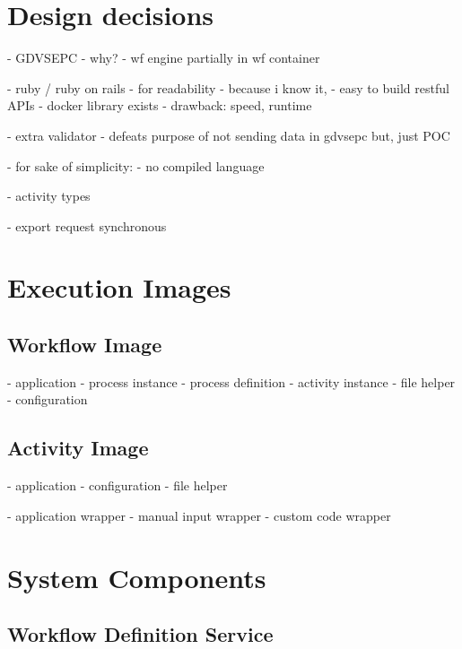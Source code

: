 
\section{Design decisions} %
\label{sec:design_decisions}

  - GDVSEPC
    - why?
  - wf engine partially in wf container

  - ruby / ruby on rails
    - for readability
    - because i know it,
    - easy to build restful APIs
    - docker library exists
    - drawback: speed, runtime

  - extra validator
    - defeats purpose of not sending data in gdvsepc but, just POC

  - for sake of simplicity:
    - no compiled language

  - activity types

  - export request synchronous

\section{Execution Images} %
\label{sec:execution_images}

  \subsection{Workflow Image} %
  \label{sub:workflow_container}
    - application
      - process instance
      - process definition
      - activity instance
      - file helper
      - configuration


  \subsection{Activity Image} %
  \label{sub:activity_containers}
    - application
      - configuration
      - file helper

    - application wrapper
    - manual input wrapper
    - custom code wrapper

\section{System Components} %
\label{sec:components_implementation}
  \subsection{Workflow Definition Service} %
    \label{sub:workflow_definition_service}

